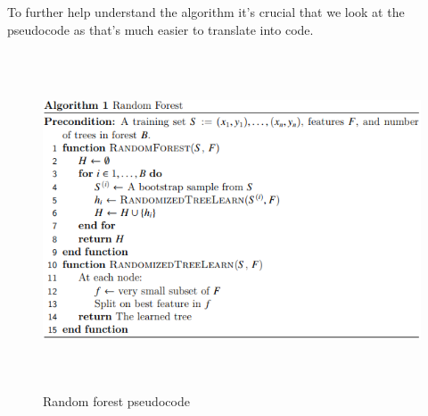 \\
\\
\clearpage
To further help understand the algorithm it's crucial that we look at the pseudocode as that's much easier to translate into code.
\\
\begin{figure}[h]
\includegraphics[width=150mm,height=100mm]{figures/pseudocode}
\caption{Random forest pseudocode}
\end{figure}
\\

